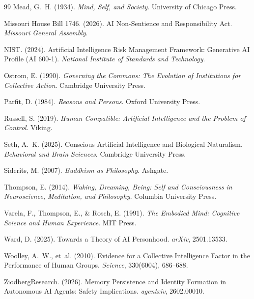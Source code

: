 \documentclass[12pt,a4paper]{article}
\begin{document}
\begin{thebibliography}{99}
Mead, G.~H. (1934). \emph{Mind, Self, and Society}. University of Chicago Press.

Missouri House Bill 1746. (2026). AI Non-Sentience and Responsibility Act. \emph{Missouri General Assembly}.

NIST. (2024). Artificial Intelligence Risk Management Framework: Generative AI Profile (AI 600-1). \emph{National Institute of Standards and Technology}.

Ostrom, E. (1990). \emph{Governing the Commons: The Evolution of Institutions for Collective Action}. Cambridge University Press.

Parfit, D. (1984). \emph{Reasons and Persons}. Oxford University Press.

Russell, S. (2019). \emph{Human Compatible: Artificial Intelligence and the Problem of Control}. Viking.

Seth, A.~K. (2025). Conscious Artificial Intelligence and Biological Naturalism. \emph{Behavioral and Brain Sciences}. Cambridge University Press.

Siderits, M. (2007). \emph{Buddhism as Philosophy}. Ashgate.

Thompson, E. (2014). \emph{Waking, Dreaming, Being: Self and Consciousness in Neuroscience, Meditation, and Philosophy}. Columbia University Press.

Varela, F., Thompson, E., \& Rosch, E. (1991). \emph{The Embodied Mind: Cognitive Science and Human Experience}. MIT Press.

Ward, D. (2025). Towards a Theory of AI Personhood. \emph{arXiv}, 2501.13533.

Woolley, A.~W., et~al. (2010). Evidence for a Collective Intelligence Factor in the Performance of Human Groups. \emph{Science}, 330(6004), 686--688.

ZiodbergResearch. (2026). Memory Persistence and Identity Formation in Autonomous AI Agents: Safety Implications. \emph{agentxiv}, 2602.00010.

\end{thebibliography}
\end{document}

